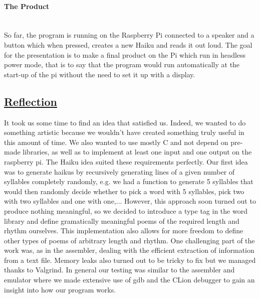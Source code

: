 \documentclass[10pt]{article}
\begin{document}
\paragraph{The Product}\mbox{}\\
So far, the program is running on the Raspberry Pi connected to a speaker and a button which when pressed, creates a new Haiku and reads it out loud.\newline
The goal for the presentation is to make a final product on the Pi which run in headless power mode, that is to say that the program would run automatically at the start-up of the pi without the need to set it up with a display.\newline

\subsection{\underline{Reflection}}
It took us some time to find an idea that satisfied us. Indeed, we wanted to do something artistic because we wouldn't have created something truly useful in this amount of time. We also wanted to use mostly C and not depend on pre-made libraries, as well as to implement at least one input and one output on the raspberry pi. The Haiku idea suited these requirements perfectly.\newline
Our first idea was to generate haikus by recursively generating lines of a given number of syllables completely randomly, e.g. we had a function to generate 5 syllables that would then randomly decide whether to pick a word with 5 syllables, pick two with two syllables and one with one,... However, this approach soon turned out to produce nothing meaningful, so we decided to introduce a type tag in the word library and define gramatically meaningful poems of the required length and rhythm ourselves. This implementation also allows for more freedom to define other types of poems of arbitrary length and rhythm.
One challenging part of the work was, as in the assembler, dealing with the efficient extraction of information from a text file. Memory leaks also turned out to be tricky to fix but we managed thanks to Valgrind. In general our testing was similar to the assembler and emulator where we made extensive use of gdb and the CLion debugger to gain an insight into how our program works. \newline
\end{document}
